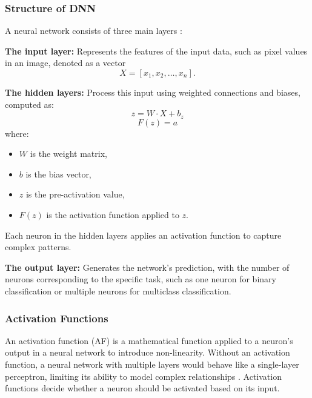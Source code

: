 \subsubsection{Structure of DNN}
A neural network consists of three main layers \parencite{ren2023review}:

\noindent
\textbf{The input layer:} Represents the features of the input data, such as pixel values in an image, denoted as a vector 
\[
X = [x_1, x_2, \dots, x_n].
\]

\noindent
\textbf{The hidden layers:} Process this input using weighted connections and biases, computed as:
\[
z = W \cdot X + b_z \tag{1}
\]
\[
F(z) = a \tag{2}
\]
where:
\begin{itemize}
    \item $W$ is the weight matrix,
    \item $b$ is the bias vector,
    \item $z$ is the pre-activation value,
    \item $F(z)$ is the activation function applied to $z$.
\end{itemize}

Each neuron in the hidden layers applies an activation function to capture complex patterns.

\noindent
\textbf{The output layer:} Generates the network's prediction, with the number of neurons corresponding to the specific task, such as one neuron for binary classification or multiple neurons for multiclass classification.




\subsubsection{Activation Functions}
An activation function (AF) is a mathematical function applied to a neuron's output in a neural network to introduce non-linearity. Without an activation function, a neural network with multiple layers would behave like a single-layer perceptron, limiting its ability to model complex relationships \parencite{dubey2022activation}. Activation functions decide whether a neuron should be activated based on its input. 

